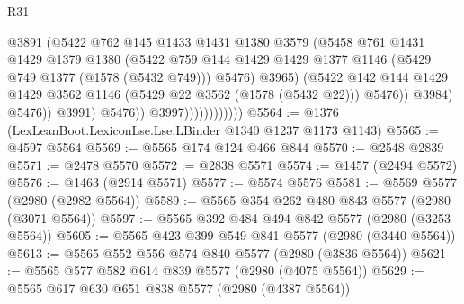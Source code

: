 \begin{lexlean}{R31}
\begin{coremodule}
                                        @3891
                                        (@5422
                                          @762
                                          @145
                                          @1433
                                          @1431
                                          @1380
                                          @3579
                                          (@5458
                                            @761
                                            @1431
                                            @1429
                                            @1379
                                            @1380
                                            (@5422
                                              @759
                                              @144
                                              @1429
                                              @1429
                                              @1377
                                              @1146
                                              (@5429 @749 @1377 (@1578 (@5432 @749)))
                                              @5476)
                                            @3965)
                                          (@5422
                                            @142
                                            @144
                                            @1429
                                            @1429
                                            @3562
                                            @1146
                                            (@5429 @22 @3562 (@1578 (@5432 @22)))
                                            @5476))
                                        @3984)
                                      @5476))
                                  @3991)
                                @5476))
                            @3997))))))))))))
@5564 := @1376 (LexLeanBoot.LexiconLse.Lse.LBinder @1340 @1237 @1173 @1143)
@5565 := @4597 @5564
@5569 := @5565 @174 @124 @466 @844
@5570 := @2548 @2839
@5571 := @2478 @5570
@5572 := @2838 @5571
@5574 := @1457 (@2494 @5572)
@5576 := @1463 (@2914 @5571)
@5577 := @5574 @5576
@5581 := @5569 @5577 (@2980 (@2982 @5564))
@5589 := @5565 @354 @262 @480 @843 @5577 (@2980 (@3071 @5564))
@5597 := @5565 @392 @484 @494 @842 @5577 (@2980 (@3253 @5564))
@5605 := @5565 @423 @399 @549 @841 @5577 (@2980 (@3440 @5564))
@5613 := @5565 @552 @556 @574 @840 @5577 (@2980 (@3836 @5564))
@5621 := @5565 @577 @582 @614 @839 @5577 (@2980 (@4075 @5564))
@5629 := @5565 @617 @630 @651 @838 @5577 (@2980 (@4387 @5564))

\end{coremodule}
\end{lexlean}
